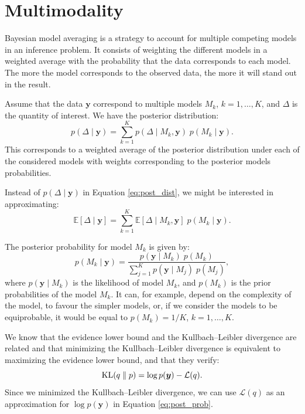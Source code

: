 \documentclass{article}
\numberwithin{equation}{section}
\DeclareMathOperator*{\KL}{{\rm KL}}
\begin{document}
\section{Multimodality}

Bayesian model averaging is a strategy to account for multiple competing models in an inference problem. It consists of weighting the different models in a weighted average with the probability that the data corresponds to each model. The more the model corresponds to the observed data, the more it will stand out in the result.

Assume that the data $\boldsymbol{y}$ correspond to multiple models $M_k$, $k= 1,\ldots,K$, and $\Delta$ is the quantity of interest. We have the posterior distribution:
\begin{equation}
p(\Delta \mid \boldsymbol{y}) = \sum_{k=1}^K p(\Delta \mid M_k,\boldsymbol{y}) \; p(M_k \mid \boldsymbol{y}).
\label{eq:post_dist}
\end{equation}
This corresponds to a weighted average of the posterior distribution under each of the considered models with weights corresponding to the posterior models probabilities.

Instead of $p(\Delta \mid \boldsymbol{y})$ in Equation \ref{eq:post_dist}, we might be interested in approximating:
\begin{equation*}
\mathbb{E}\left[\Delta \mid \boldsymbol{y}\right] = \sum_{k=1}^K\mathbb{E}\left[\Delta \mid M_k, \boldsymbol{y}\right]\;p(M_k \mid \boldsymbol{y}).
\end{equation*}

The posterior probability for model $M_k$ is given by:
\begin{equation}
p(M_k \mid \boldsymbol{y}) = \frac{p(\boldsymbol{y} \mid M_k)\; p(M_k)}{\sum_{j=1}^K p(\boldsymbol{y} \mid M_j)\; p(M_j)},
\label{eq:post_prob}
\end{equation}
where $p(\boldsymbol{y} \mid M_k)$ is the likelihood of model $M_k$, and $p(M_k)$ is the prior probabilities of the model $M_k$. It can, for example, depend on the complexity of the model, to favour the simpler models, or, if we consider the models to be equiprobable, it would be equal to $p(M_k) = 1/K$, $k = 1,\ldots,K$.  

We know that the evidence lower bound and the Kullbach--Leibler divergence are related and that minimizing the Kullbach--Leibler divergence is equivalent to maximizing the evidence lower bound, and that they verify: 
\begin{equation*}
\KL(q\parallel p) = \log p (\boldsymbol{y}) - \mathcal{L}(q).
\end{equation*}
Since we minimized the Kullbach--Leibler divergence, we can use $\mathcal{L}(q)$ as an approximation for $\log p(\boldsymbol{y})$ in Equation \ref{eq:post_prob}.
\end{document}
